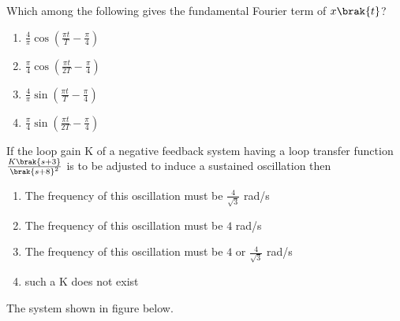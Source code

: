 Which among the following gives the fundamental Fourier term of $x\brak{t}$?
\begin{multicols}{2}
\begin{enumerate}
       \item $\frac{4}{\pi}\cos({\frac{\pi t}{T}-\frac{\pi}{4}})$
       \item $\frac{\pi}{4}\cos({\frac{\pi t}{2T}-\frac{\pi}{4}})$
       \item $\frac{4}{\pi}\sin({\frac{\pi t}{T}-\frac{\pi}{4}})$
       \item $\frac{\pi}{4}\sin({\frac{\pi t}{2T}-\frac{\pi}{4}})$
\end{enumerate}
\end{multicols}
\item If the loop gain K of a negative feedback system having a loop transfer function $\frac{K\brak{s+3}}{\brak{s+8}^2}$ is to be adjusted to induce a sustained oscillation then 
\begin{enumerate}
    \item The frequency of this oscillation must be $\frac{4}{\sqrt{3}}$ rad/s
    \item The frequency of this oscillation must be $4$ rad/s
    \item The frequency of this oscillation must be $4$ or $\frac{4}{\sqrt{3}}$ rad/s
    \item such a K does not exist
\end{enumerate}
\item The system shown in figure below.
